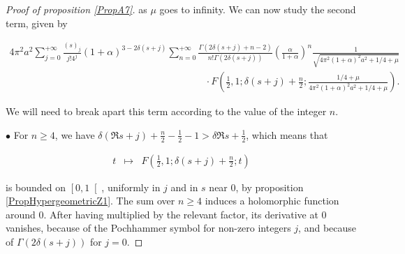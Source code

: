 \documentclass{jams-l}
\theoremstyle{definition}
\theoremstyle{remark}
\numberwithin{equation}{section}
\begin{document}
\begin{proof}[Proof of proposition \ref{PropA7}]
                \noindent as $\mu$ goes to infinity. We can now study the second term, given by
                
                \[ \begin{array}{l}
                        \scriptstyle 4 \pi^2 a^2 \sum\limits_{j = 0}^{+ \infty} \frac{\left( s \right)_j}{j! 4^j} \left( 1 + \alpha \right)^{3 - 2 \delta \left( s + j \right)} \sum\limits_{n = 0}^{+ \infty} \frac{\Gamma \left( 2 \delta \left( s + j \right) + n - 2 \right)}{n! \Gamma \left( 2 \delta \left( s + j \right) \right)} \left( \frac{\alpha}{1 + \alpha} \right)^n \frac{1}{\sqrt{4 \pi^2 \left( 1 + \alpha \right)^2 a^2 + 1/4 + \mu}} \\[0.7em] 
                        
                        \scriptstyle \qquad \qquad \qquad \qquad \qquad \qquad \qquad \qquad \qquad \qquad \cdot F \left( \frac{1}{2}, 1; \delta \left( s + j \right) + \frac{n}{2}; \frac{1/4 + \mu}{4 \pi^2 \left( 1 + \alpha \right)^2 a^2 + 1/4 + \mu} \right). 
                    \end{array} \]
                
                \noindent We will need to break apart this term according to the value of the integer $n$.
                
                \medskip
                
                \hspace{10pt} $\bullet$ For $n \geqslant 4$, we have  $\delta \left( \Re s + j \right) + \frac{n}{2} - \frac{1}{2} - 1 > \delta \Re s + \frac{1}{2}$, which means that
                
                    \[ \begin{array}{lll}
                            t & \longmapsto & F \left( \frac{1}{2}, 1; \delta \left( s + j \right) + \frac{n}{2}; t \right)
                        \end{array} \]
                
                    \noindent is bounded on $\left[ 0, 1 \right[$, uniformly in $j$ and in $s$ near $0$, by proposition \ref{PropHypergeometricZ1}. The sum over $n \geqslant 4$ induces a holomorphic function around $0$. After having multiplied by the relevant factor, its derivative at $0$ vanishes, because of the Pochhammer symbol for non-zero integers $j$, and because of $\Gamma \left( 2 \delta \left( s + j \right) \right)$ for $j = 0$.
                
                    \medskip
                

\end{proof}
\end{document}
